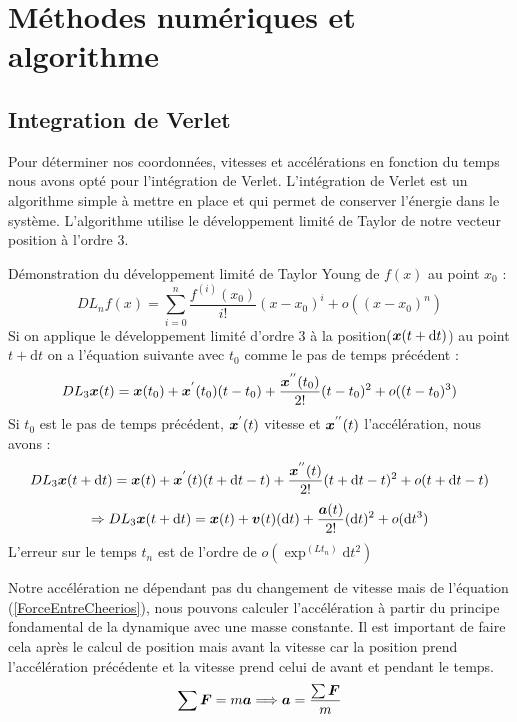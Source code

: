 \documentclass[a4paper, 11pt, oneside]{article} %
\newcommand{\dd}[1]{\mathrm{d}#1}
\begin{document}
        \section{Méthodes numériques et algorithme}
        \subsection{Integration de Verlet}
            Pour déterminer nos coordonnées, vitesses et accélérations en fonction du temps nous avons opté pour l'intégration de Verlet. L'intégration de Verlet est un algorithme simple à mettre en place et qui permet de conserver l'énergie dans le système. L'algorithme utilise le développement limité de Taylor de notre vecteur position à l'ordre 3.

            Démonstration du développement limité de Taylor Young de $f(x)$ au point $x_0$\cite{agarwal_introduction_2011} :%
            \begin{equation}
                DL_n f(x) = \sum_{i=0}^{n}\frac{f^{(i)}(x_0)}{i!}(x-x_0)^i+ o((x-x_0)^n)
            \end{equation}
            Si on applique le développement limité d'ordre 3 à la position($\vb*{x}(t+\dd t)$) au point $t+\dd t$ on a l'équation suivante avec $t_0$ comme le pas de temps précédent :
            \[DL_3 \vb*{x}(t) = \vb*{x}(t_0)+\vb*{x}^{'}(t_0)(t-t_0)+\frac{\vb*{x}^{''}(t_0)}{2!}(t-t_0)^2 +o((t-t_0)^3)\]
            Si $t_0$ est le pas de temps précédent, $\vb*{x}^{'}(t)$ vitesse et $\vb*{x}^{''}(t)$ l'accélération, nous avons :
                \[DL_3 \vb*{x}(t+\dd t) = \vb*{x}(t)+\vb*{x}^{'}(t)(t+\dd t-t)+\frac{\vb*{x}^{''}(t)}{2!}(t+\dd t-t)^2+o(t+\dd t-t)\]
                \[\Rightarrow DL_3 \vb*{x}(t+\dd t)= \vb*{x}(t)+\vb*{v}(t)(\dd t)+\frac{\vb*{a}(t)}{2!}(\dd t)^2+o(\dd t^3)\]
            L'erreur sur le temps $t_n$ est de l'ordre de $o(\exp^(Lt_n)\dd t^2)$ %
    
            Notre accélération ne dépendant pas du changement de vitesse mais de l'équation (\ref{ForceEntreCheerios}), nous pouvons calculer l'accélération à partir du principe fondamental de la dynamique avec une masse constante. Il est important de faire cela après le calcul de position mais avant la vitesse car la position prend l'accélération précédente et la vitesse prend celui de avant et pendant le temps.
            \begin{equation}
                \label{PFD}
                \sum  \vb*{F} = m\vb*{a} \Longrightarrow \vb*{a} = \frac{\sum \vb*{F}}{m}
            \end{equation}
    
\end{document}

